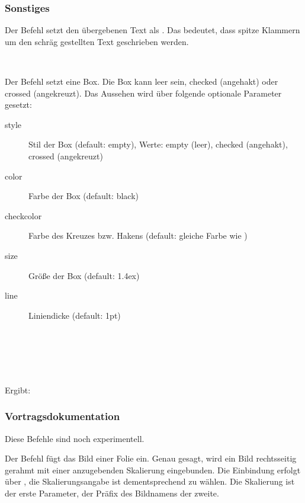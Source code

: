 \subsubsection{Sonstiges}

\DescribeMacro{\meta}
Der Befehl  setzt den übergebenen Text als .
Das bedeutet, dass spitze Klammern um den schräg gestellten Text geschrieben werden.
\begin{nutzung}
		\>\\
	\beispiel
		\>
\end{nutzung}

\DescribeMacro{\basBox}
Der Befehl  setzt eine Box.
Die Box kann leer sein, checked (angehakt) oder crossed (angekreuzt).
Das Aussehen wird über folgende optionale Parameter gesetzt:

\begin{description}
	\item[style] Stil der Box (default: empty), Werte: empty (leer), checked (angehakt), crossed (angekreuzt)
	\item[color] Farbe der Box (default: black)
	\item[checkcolor] Farbe des Kreuzes bzw. Hakens (default: gleiche Farbe wie )
	\item[size] Größe der Box (default: 1.4ex)
	\item[line] Liniendicke (default: 1pt)
\end{description}

\begin{nutzung}
		\>\\
	\beispiel
		\>\\
		\>\\
		\>\\
		\>
\end{nutzung}

Ergibt: \basBox{} \basBox[style=crossed] \basBox[style=checked] \basBox[style=crossed, color=Coral]

\subsubsection{Vortragsdokumentation}

Diese Befehle sind noch experimentell.

\DescribeMacro{\insertslide}
Der Befehl  fügt das Bild einer Folie ein.
Genau gesagt, wird ein Bild rechtsseitig gerahmt mit einer anzugebenden Skalierung eingebunden.
Die Einbindung erfolgt über , die Skalierungsangabe ist dementsprechend zu wählen.
Die Skalierung ist der erste Parameter, der Präfix des Bildnamens der zweite.

